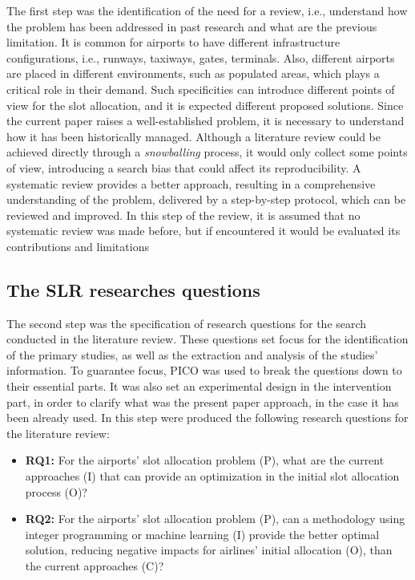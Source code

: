 The first step was the identification of the need for a review, i.e., understand how the problem has been addressed in past research and what are the previous limitation. It is common for airports to have different infrastructure configurations, i.e., runways, taxiways, gates, terminals. Also, different airports are placed in different environments, such as populated areas, which plays a critical role in their demand. Such specificities can introduce different points of view for the slot allocation, and it is expected different proposed solutions. Since the current paper raises a well-established problem, it is necessary to understand how it has been historically managed. Although a literature review could be achieved directly through a \textit{snowballing} process, it would only collect some points of view, introducing a search bias that could affect its reproducibility. A systematic review provides a better approach, resulting in a comprehensive understanding of the problem, delivered by a step-by-step protocol, which can be reviewed and improved. In this step of the review, it is assumed that no systematic review was made before, but if encountered it would be evaluated its contributions and limitations

\subsection{The \acrshort{SLR} researches questions}

The second step was the specification of research questions for the search conducted in the literature review. These questions set focus for the identification of the primary studies, as well as the extraction and analysis of the studies' information. To guarantee focus, PICO was used to break the questions down to their essential parts. It was also set an experimental design in the intervention part, in order to clarify what was the present paper approach, in the case it has been already used. In this step were produced the following research questions for the literature review:
\begin{itemize}
    \item \textbf{RQ1:} For the airports' slot allocation problem (P), what are the current approaches (I) that can provide an optimization in the initial slot allocation process (O)?
    \item \textbf{RQ2:} For the airports' slot allocation problem (P), can a methodology using integer programming or machine learning (I) provide the better optimal solution, reducing negative impacts for airlines' initial allocation (O), than the current approaches (C)?
\end{itemize}

